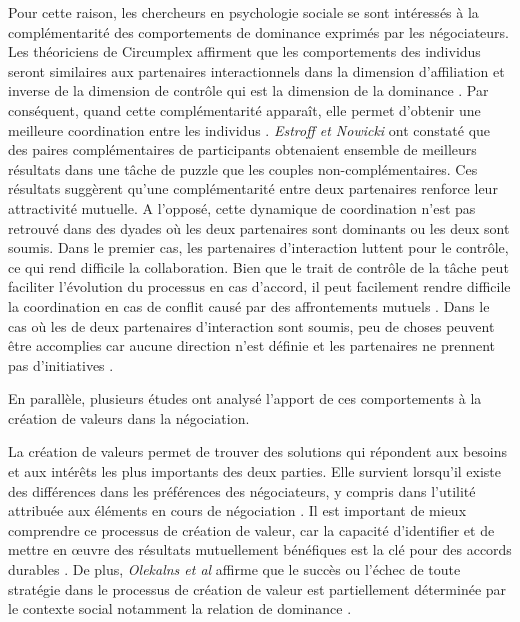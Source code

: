 	Pour cette raison, les chercheurs en psychologie sociale se sont intéressés à la complémentarité des comportements de dominance exprimés par les négociateurs. 
	Les théoriciens de Circumplex affirment que les comportements des individus seront similaires aux partenaires interactionnels dans la dimension d'affiliation et inverse  de la dimension de contrôle qui est la dimension de la dominance \cite{tiedens2003power}.
	Par conséquent, quand cette complémentarité apparaît, elle permet d'obtenir une meilleure coordination entre les individus \cite{wiltermuth2015benefits}. \emph{Estroff et Nowicki} \cite{estroff1992interpersonal} ont constaté que des paires complémentaires de participants obtenaient ensemble de meilleurs résultats dans une tâche de puzzle que les couples non-complémentaires. Ces résultats suggèrent qu'une complémentarité entre deux partenaires renforce leur attractivité mutuelle.
	A l'opposé, cette dynamique de coordination n'est pas retrouvé dans des dyades où les deux partenaires sont dominants ou les deux sont soumis. 
	Dans le premier cas, les partenaires d'interaction luttent pour le contrôle, ce qui rend difficile la collaboration. Bien que le trait de contrôle de la tâche peut faciliter l'évolution du processus en cas d'accord, il peut facilement rendre difficile la coordination en cas de conflit causé par des affrontements mutuels \cite{wiltermuth2015benefits}. Dans le cas où les de deux partenaires d'interaction sont soumis, peu de choses peuvent être accomplies car aucune direction n'est définie et les partenaires ne prennent pas d'initiatives \cite{wiltermuth2015benefits}.
	 
	
	En parallèle, plusieurs études ont analysé l'apport de ces comportements à la création de valeurs dans la négociation.
	
	La création de valeurs permet de trouver des solutions qui répondent aux besoins et aux intérêts les plus importants des deux parties. Elle survient lorsqu'il existe des différences dans les préférences des négociateurs, y compris dans l'utilité attribuée  aux éléments en cours de négociation \cite{lax1986managerial}. 
	Il est important de mieux comprendre ce processus de création de valeur, car la capacité d'identifier et de mettre en œuvre des résultats mutuellement bénéfiques est la clé pour des accords durables \cite{wiltermuth2015benefits}.
	De plus, \emph{Olekalns et al} affirme que le succès ou l'échec de toute stratégie dans le processus de création de valeur est partiellement déterminée par le contexte social notamment la relation de dominance \cite{olekalns2013dyadic}.
	

